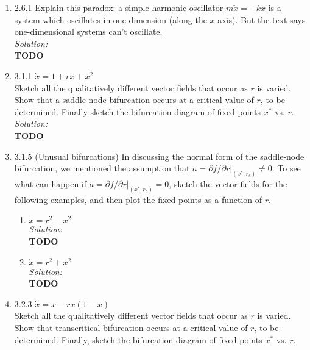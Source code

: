 \documentclass[10pt]{amsart}
\theoremstyle{nonumberplain}
\begin{document}
\begin{enumerate}[label={\bf {\arabic*}:}]
\item 2.6.1 Explain this paradox: a simple harmonic oscillator $m\ddot {x} = -k x$ is a system which oscillates in one dimension (along the $x$-axis). But the text says one-dimensional systems can't oscillate. \\

\noindent
\textit{Solution:} \\
\textbf{TODO} \\

\item 3.1.1 $\dot x = 1 + rx + x^2$ \\
Sketch all the qualitatively different vector fields that occur as $r$ is varied.
Show that a saddle-node bifurcation occurs at a critical value of $r$, to be determined.
Finally sketch the bifurcation diagram of fixed points $x^*$ vs. $r$. \\

\noindent
\textit{Solution:} \\
\textbf{TODO} \\

\item 3.1.5 (Unusual bifurcations) In discussing the normal form of the saddle-node bifurcation, we mentioned the assumption that $a = \left. \partial f / \partial r \right|_{(x^*, r_c)} \neq 0.$
To see what can happen if $a = \left. \partial f / \partial r \right|_{(x^*, r_c)} = 0$, sketch the vector fields for the following examples, and then plot the fixed points as a function of $r$. \\

\begin{enumerate}
\item $\dot x = r^2 - x^2$ \\
\textit{Solution:} \\
\textbf{TODO} \\

\item $\dot x = r^2 + x^2$ \\
\textit{Solution:} \\
\textbf{TODO} \\
\end{enumerate}


\item 3.2.3 $\dot x = x - rx(1 - x)$ \\
Sketch all the qualitatively different vector fields that occur as $r$ is varied.
Show that transcritical bifurcation occurs at a critical value of $r$, to be determined.
Finally, sketch the bifurcation diagram of fixed points $x^*$ vs. $r$. \\


\end{enumerate}
\end{document}
